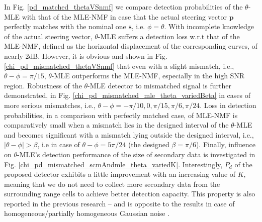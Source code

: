 \indent In Fig. \ref{pd_matched_thetaVSnmf} we compare
detection probabilities of the $\theta$-MLE
 with that of the
MLE-NMF in case that the actual steering vector $\boldsymbol{p}$
perfectly matches with the nominal one $\boldsymbol{s}$,
i.e. $\phi = \theta$.
With incomplete knowledge of the actual steering vector,
$\theta$-MLE suffers a detection loss w.r.t
that of the MLE-NMF,
defined as the horizontal displacement of the corresponding curves,
of nearly 2dB. However, it is obvious and
shown in Fig. \ref{chi_pd_mismatched_thetaVSnmf} that even with a slight mismatch,
 i.e., $\theta - \phi= \pi/15$,
  $\theta$-MLE
  outperforms the
  MLE-NMF, especially in the high SNR region.
  Robustness of the $\theta$-MLE detector to mismatched signal is further demonstrated, in
  Fig. \ref{chi_pd_mismatched_mle_theta_variedBeta}
  in cases of more serious mismatches, i.e., $\theta - \phi = -\pi/10, 0, \pi/15, \pi/6, \pi/24$.
  Loss in detection probabilities, in a comparison with perfectly matched case,
   of MLE-NMF
   is comparatively small
   when a mismatch lies in the designed interval of the $\theta$-MLE
    and becomes significant with a mismatch lying outside
 the designed interval, i.e., $|\theta - \phi| > \beta$, i.e in case of
 $\theta - \phi = 5\pi/24$ (the designed $\beta = \pi/6$).
    Finally, influence on $\theta$-MLE's detection performance of the size of secondary data
 is investigated in Fig. \ref{chi_pd_mismatched_scmAndmle_theta_variedK}.
Interestingly, $P_d$ of the proposed detector exhibits a little improvement with an increasing value of $K$,
meaning that we do not need to collect more secondary data from the surrounding range cells to
achieve better detection capacity.
This property is also
reported in the previous research \cite{Conte95}--\cite{Conte_Aug02} and is opposite to the results in
case of homogeneous/partially homogeneous Gaussian noise \cite{Conte01}.

 